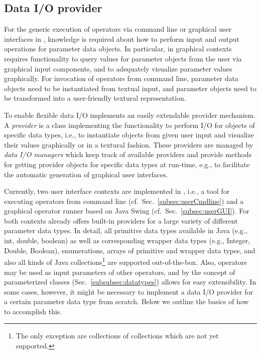 \subsection{Data I/O provider}
For the generic execution of operators via command line or graphical user
interfaces in \alida, knowledge is required about how to perform input and
output operations for parameter data objects.
In particular, in graphical contexts \alida requires functionality to query 
values for parameter objects from the user via graphical input components, and
to adequately visualize parameter values graphically. For invocation of operators from 
command line, parameter data objects need to be instantiated from textual input,
and parameter objects need to be transformed into a user-friendly textural representation. 

To enable flexible data I/O \alida implements an easily extendable provider mechanism. 
A {\em provider} is a class implementing the functionality to perform I/O for
objects of specific data types, i.e., to instantiate objects from given user
input and visualize their values graphically or in a textural fashion. These
providers are managed by {\em data I/O managers} which keep track of available
providers and provide methods for getting provider objects for specific data
types at run-time, e.g., to facilitate the automatic generation of graphical user interfaces.

Currently, two user interface contexts are implemented in \alida, i.e., a tool
for executing operators from command line (cf.~Sec.~\ref{subsec:userCmdline})
and a graphical operator runner based on Java Swing (cf.~Sec.~\ref{subsec:userGUI}). For both contexts \alida already offers 
built-in providers for a large variety of different parameter data types. In detail, all primitive 
data types available in Java (e.g., int, double, boolean) as well as corresponding wrapper data 
types (e.g., Integer, Double, Boolean), enumerations, arrays of primitive and wrapper data types, 
and also all kinds of Java collections\footnote{The only exception are
collections of collections which are not yet supported.} are supported
out-of-the-box.
Also, operators may be used as input parameters of other operators, and by the concept 
of parameterized classes (Sec.~\ref{subsubsec:datatypes}) \alida allows for easy extensibility. In some cases,
however, it might be necessary to implement a data I/O provider for a certain 
parameter data type from scratch. 
Below we outline the basics of how to accomplish this.
 

